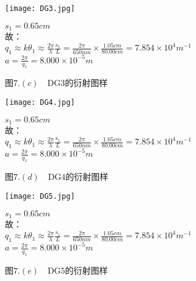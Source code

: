 \documentclass{ctexart}
\begin{document}
\begin{figure}[H]
  \begin{minipage}[c]{0.4\linewidth}
    \texttt{[image: DG3.jpg]}
    \caption*{图$7.(c)\quad \mathrm{DG3}$的衍射图样}
    \end{minipage}
    \hspace{1cm}
    \begin{minipage}[c]{0.6\linewidth}
      \noindent $s_1=0.65cm$\\
      故：\\
      $q_1\approx k\theta_1 \approx \frac{2\pi}{\lambda}\frac{s_1}{L}=\frac{2\pi}{650nm} \times \frac{1.05cm}{80.00cm}=7.854\times 10^4m^{-1}$\\
      $a=\frac{2\pi}{q_1}=8.000\times 10^{-5}m$
    \end{minipage}
\end{figure}
\begin{figure}[H]
  \begin{minipage}[c]{0.4\linewidth}
    \texttt{[image: DG4.jpg]}
    \caption*{图$7.(d)\quad \mathrm{DG4}$的衍射图样}
    \end{minipage}
    \hspace{1cm}
    \begin{minipage}[c]{0.6\linewidth}
      \noindent $s_1=0.65cm$\\
      故：\\
      $q_1\approx k\theta_1 \approx \frac{2\pi}{\lambda}\frac{s_1}{L}=\frac{2\pi}{650nm} \times \frac{1.05cm}{80.00cm}=7.854\times 10^4m^{-1}$\\
      $a=\frac{2\pi}{q_1}=8.000\times 10^{-5}m$
    \end{minipage}
\end{figure}
\begin{figure}[H]
  \begin{minipage}[c]{0.4\linewidth}
    \texttt{[image: DG5.jpg]}
    \caption*{图$7.(e)\quad \mathrm{DG5}$的衍射图样}
    \end{minipage}
    \hspace{1cm}
    \begin{minipage}[c]{0.6\linewidth}
      \noindent $s_1=0.65cm$\\
      故：\\
      $q_1\approx k\theta_1 \approx \frac{2\pi}{\lambda}\frac{s_1}{L}=\frac{2\pi}{650nm} \times \frac{1.05cm}{80.00cm}=7.854\times 10^4m^{-1}$\\
      $a=\frac{2\pi}{q_1}=8.000\times 10^{-5}m$
    \end{minipage}
\end{figure}    
\end{document}
